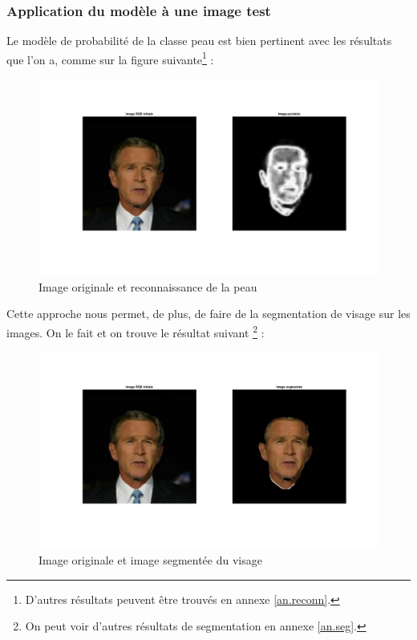 \documentclass[11pt,a4paper]{article}
\begin{document}
\subsubsection{Application du modèle à une image test}

Le modèle de probabilité de la classe peau est bien pertinent avec les résultats que l'on a, comme sur la figure suivante\footnote{D'autres résultats peuvent être trouvés en annexe \ref{an.reconn}.} :

\begin{figure}[H]
\center
\includegraphics[width=15cm]{exo2_skin1.png}
\caption{Image originale et reconnaissance de la peau}

\end{figure}

Cette approche nous permet, de plus, de faire de la segmentation de visage sur les images. On le fait et on  trouve le résultat suivant \footnote{On peut voir d'autres résultats de segmentation en annexe \ref{an.seg}.} :


\begin{figure}[H]
\center
\includegraphics[width=15cm]{exo2_image_seg.png}
\caption{Image originale et image segmentée du visage}
\label{fig.exo2_image_seg}
\end{figure} 
\end{document}
